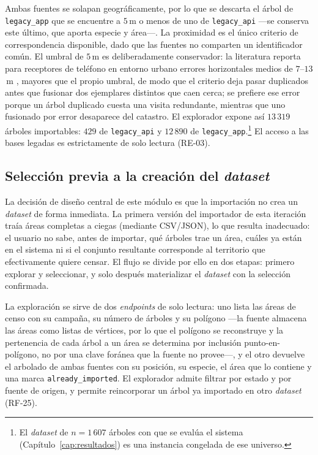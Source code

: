 Ambas fuentes se solapan geográficamente, por lo que se descarta el árbol de \texttt{legacy\_app}
que se encuentre a $5$\,m o menos de uno de \texttt{legacy\_api} ---se conserva este último, que
aporta especie y área---. La proximidad es el único criterio de correspondencia disponible, dado
que las fuentes no comparten un identificador común. El umbral de $5$\,m es deliberadamente
conservador: la literatura reporta para receptores de teléfono en entorno urbano errores
horizontales medios de $7$--$13$\,m \citep{merry2019smartphone}, mayores que el propio umbral, de
modo que el criterio deja pasar duplicados antes que fusionar dos ejemplares distintos que caen
cerca; se prefiere ese error porque un árbol duplicado cuesta una visita redundante, mientras que
uno fusionado por error desaparece del catastro. El explorador expone así $13\,319$ árboles
importables: $429$ de \texttt{legacy\_api} y $12\,890$ de
\texttt{legacy\_app}.\footnote{El \textit{dataset} de $n = 1\,607$ árboles con que se evalúa el
sistema (Capítulo~\ref{cap:resultados}) es una instancia congelada de ese universo.} El acceso a
las bases legadas es estrictamente de solo lectura
(RE-03).

\subsection{Selección previa a la creación del \textit{dataset}}

La decisión de diseño central de este módulo es que la importación no crea un \textit{dataset} de
forma inmediata. La primera versión del importador de esta iteración traía áreas completas a ciegas
(mediante CSV/JSON), lo que resulta inadecuado: el usuario no sabe, antes de importar, qué árboles
trae un área, cuáles ya están en el sistema ni si el conjunto resultante corresponde al territorio
que efectivamente quiere censar. El flujo se divide por ello en dos etapas: primero explorar y
seleccionar, y solo después materializar el \textit{dataset} con la selección confirmada.

La exploración se sirve de dos \textit{endpoints} de solo lectura: uno lista las áreas de censo con
su campaña, su número de árboles y su polígono ---la fuente almacena las áreas como listas de
vértices, por lo que el polígono se reconstruye y la pertenencia de cada árbol a un área se
determina por inclusión punto-en-polígono, no por una clave foránea que la fuente no provee---, y
el otro devuelve el arbolado de ambas fuentes con su posición, su especie, el área que lo contiene
y una marca \texttt{already\_imported}. El explorador admite filtrar por estado y por fuente de
origen, y permite reincorporar un árbol ya importado en otro \textit{dataset} (RF-25).

